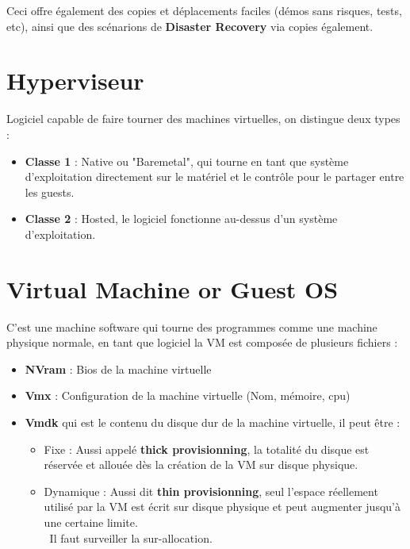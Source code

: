 \documentclass{report}
\begin{document}
		Ceci offre également des copies et déplacements faciles (démos sans risques, tests, etc), ainsi que des scénarions de \textbf{Disaster Recovery} via copies également.\\

	\section{Hyperviseur}

		Logiciel capable de faire tourner des machines virtuelles, on distingue deux types : \\

		\begin{itemize}
			\item \textbf{Classe 1} : Native ou "Baremetal", qui tourne en tant que système d'exploitation directement sur le matériel et le contrôle pour le partager entre les guests.\\
			\item \textbf{Classe 2} : Hosted, le logiciel fonctionne au-dessus d'un système d'exploitation.\\
		\end{itemize}

	\section{Virtual Machine or Guest OS}

		C'est une machine software qui tourne des programmes comme une machine physique normale, en tant que logiciel la VM est composée de plusieurs fichiers : \\

		\begin{itemize}
			\item \textbf{NVram} : Bios de la machine virtuelle
			\item \textbf{Vmx} : Configuration de la machine virtuelle (Nom, mémoire, cpu)
			\item \textbf{Vmdk} qui est le contenu du disque dur de la machine virtuelle, il peut être : \\
			\begin{itemize}
				\item Fixe : Aussi appelé \textbf{thick provisionning}, la totalité du disque est réservée et allouée dès la création de la VM sur disque physique.
				\item Dynamique : Aussi dit \textbf{thin provisionning}, seul l'espace réellement utilisé par la VM est écrit sur disque physique et peut augmenter jusqu'à une certaine limite.\\ Il faut surveiller la sur-allocation.\\
			\end{itemize}
		\end{itemize}
\end{document}
